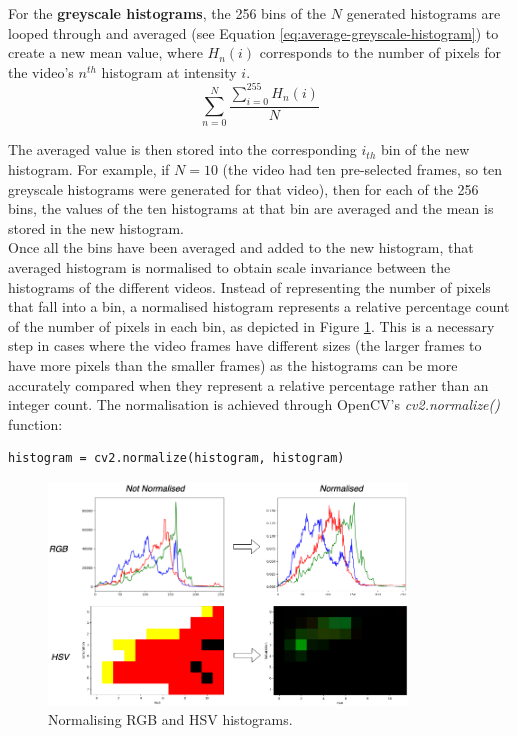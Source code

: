 For the \textbf{greyscale histograms}, the 256 bins of the $N$ generated histograms are looped through and averaged (see Equation \ref{eq:average-greyscale-histogram}) to create a new mean value, where $H_n(i)$ corresponds to the number of pixels for the video's $n^{th}$ histogram at intensity $i$.
\begin{equation}
\label{eq:average-greyscale-histogram}
    \sum_{n=0}^{N} \frac{\sum_{i=0}^{255} H_n(i)}{N}
\end{equation}

The averaged value is then stored into the corresponding $i_{th}$ bin of the new histogram. For example, if $N=10$ (the video had ten pre-selected frames, so ten greyscale histograms were generated for that video), then for each of the 256 bins, the values of the ten histograms at that bin are averaged and the mean is stored in the new histogram.\\

Once all the bins have been averaged and added to the new histogram, that averaged histogram is normalised to obtain scale invariance between the histograms of the different videos. Instead of representing the number of pixels that fall into a bin, a normalised histogram represents a relative percentage count of the number of pixels in each bin, as depicted in Figure \ref{fig:implementation-normalise-histogram}. This is a necessary step in cases where the video frames have different sizes (the larger frames to have more pixels than the smaller frames) as the histograms can be more accurately compared when they represent a relative percentage rather than an integer count. The normalisation is achieved through OpenCV's \textit{cv2.normalize()} function:

\begin{lstlisting}
histogram = cv2.normalize(histogram, histogram)
\end{lstlisting}

\begin{figure}[h] 
\centerline{\includegraphics[width=0.85\textwidth]{figures/implementation/normalise-histogram.png}}
\caption{\label{fig:implementation-normalise-histogram}Normalising RGB and HSV histograms.}
\end{figure}

